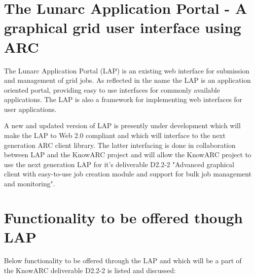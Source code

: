 \documentclass[11pt,oneside,a4paper,english]{article}
\begin{document}
\section*{The Lunarc Application Portal - A graphical grid user interface using ARC}
The Lunarc Application Portal (LAP) is an existing web interface for submission and management of grid jobs. As reflected in the name the LAP is an application oriented portal, providing easy to use interfaces for commonly available applications. The LAP is also a framework for implementing web interfaces for user applications.

A new and updated version of LAP is presently under development which will make the LAP to Web 2.0 compliant and which will interface to the next generation ARC client library. The latter interfacing is done in collaboration between LAP and the KnowARC project and will allow the KnowARC project to use the next generation LAP for it's deliverable D2.2-2 "Advanced graphical client with easy-to-use job creation module and support for bulk job management and monitoring".

\section*{Functionality to be offered though LAP}
Below functionality to be offered through the LAP and which will be a part of the KnowARC deliverable D2.2-2 is listed and discussed:
\end{document}
